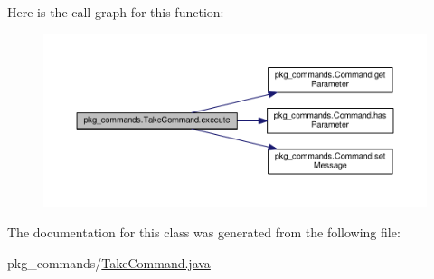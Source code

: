 Here is the call graph for this function\-:\nopagebreak
\begin{figure}[H]
\begin{center}
\leavevmode
\includegraphics[width=350pt]{classpkg__commands_1_1TakeCommand_a17789062aaf2ab5747c7eeac118875cd_cgraph}
\end{center}
\end{figure}




The documentation for this class was generated from the following file\-:\begin{DoxyCompactItemize}
\item 
pkg\-\_\-commands/\hyperlink{TakeCommand_8java}{Take\-Command.\-java}\end{DoxyCompactItemize}
